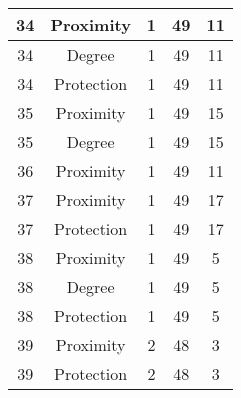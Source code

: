 \documentclass[results.tex]{subfiles}
\begin{document}
\begin{center}
\begin{tabular}{| c || c | c | c | c |}
            \hline
            34                      & Proximity                    & 1                      & 49                      & 11                   \\
            \hline
            34                      & Degree                       & 1                      & 49                      & 11                   \\
            \hline
            34                      & Protection                   & 1                      & 49                      & 11                   \\
            \hline
            35                      & Proximity                    & 1                      & 49                      & 15                   \\
            \hline
            35                      & Degree                       & 1                      & 49                      & 15                   \\
            \hline
            36                      & Proximity                    & 1                      & 49                      & 11                   \\
            \hline
            37                      & Proximity                    & 1                      & 49                      & 17                   \\
            \hline
            37                      & Protection                   & 1                      & 49                      & 17                   \\
            \hline
            38                      & Proximity                    & 1                      & 49                      & 5                    \\
            \hline
            38                      & Degree                       & 1                      & 49                      & 5                    \\
            \hline
            38                      & Protection                   & 1                      & 49                      & 5                    \\
            \hline
            39                      & Proximity                    & 2                      & 48                      & 3                    \\
            \hline
            39                      & Protection                   & 2                      & 48                      & 3                    \\

\end{tabular}
\end{center}
\end{document}
